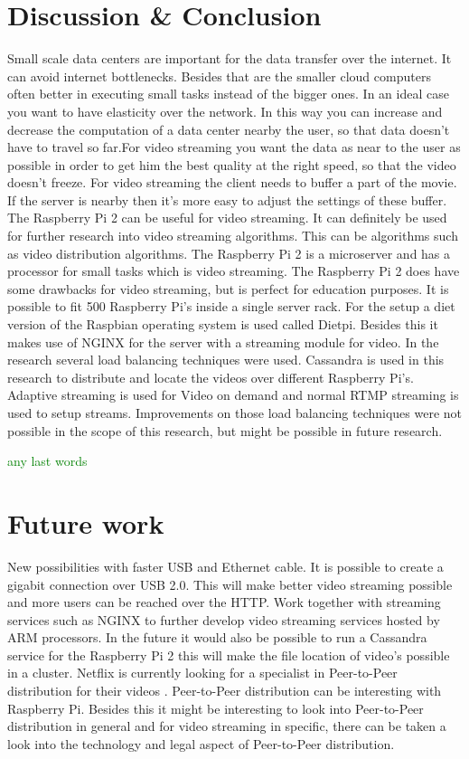 \documentclass{sig-alternate-br}
\newcommand\todo[1]{
	\textcolor{green}{#1}
}
\begin{document}
\section{Discussion \& Conclusion}
Small scale data centers are important for the data transfer over the internet. It can avoid internet bottlenecks. Besides that are the smaller cloud computers often better in executing small tasks instead of the bigger ones.  In an ideal case you want to have elasticity over the network. In this way you can increase and decrease the computation of a data center nearby the user, so that data doesn't have to travel so far.For video streaming you want the data as near to the user as possible in order to get him the best quality at the right speed, so that the video doesn't freeze. For video streaming the client needs to buffer a part of the movie. If the server is nearby then it's more easy to adjust the settings of these buffer.  \newline
The Raspberry Pi 2 can be useful for video streaming. It can definitely be used for further research into video streaming algorithms. This can be algorithms such as video distribution algorithms. The Raspberry Pi 2 is a microserver and has a processor for small tasks which is video streaming. The Raspberry Pi 2 does have some drawbacks for video streaming, but is perfect for education purposes. \newline
It is possible to fit 500 Raspberry Pi's inside a single server rack. \newline
For the setup a diet version of the Raspbian operating system is used called Dietpi. Besides this it makes use of NGINX for the server with a streaming module for video. \newline
In the research several load balancing techniques were used. Cassandra is used in this research to distribute and locate the videos over different Raspberry Pi's. Adaptive streaming is used for Video on demand and normal RTMP streaming is used to setup streams. Improvements on those load balancing techniques were not possible in the scope of this research, but might be possible in future research. 
\todo{any last words	}

\section{Future work}
New possibilities with faster USB and Ethernet cable. It is possible to create a gigabit connection over USB 2.0. This will make better video streaming possible and more users can be reached over the HTTP. Work together with streaming services such as NGINX to further develop video streaming services hosted by ARM processors. In the future it would also be possible to run a Cassandra service for the Raspberry Pi 2 this will make the file location of video's possible in a cluster. Netflix is currently looking for a specialist in  Peer-to-Peer distribution for their videos \cite{netflix}.  Peer-to-Peer distribution can be interesting with Raspberry Pi. Besides this it might be interesting to look into Peer-to-Peer distribution in general and for video streaming in specific, there can be taken a look into the technology and legal aspect of  Peer-to-Peer distribution. 
\end{document}
